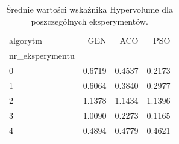 \begin{table}
\caption{Średnie wartości wskaźnika Hypervolume dla poszczególnych eksperymentów.}
\label{tab:hv_srednie}
\begin{tabular}{lrrr}
\toprule
algorytm & GEN & ACO & PSO \\
nr_eksperymentu &  &  &  \\
\midrule
0 & 0.6719 & 0.4537 & 0.2173 \\
1 & 0.6064 & 0.3840 & 0.2977 \\
2 & 1.1378 & 1.1434 & 1.1396 \\
3 & 1.0090 & 0.2273 & 0.1165 \\
4 & 0.4894 & 0.4779 & 0.4621 \\
\bottomrule
\end{tabular}
\end{table}
